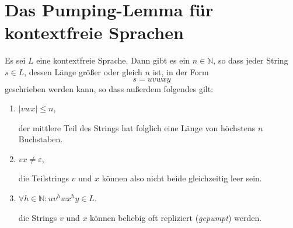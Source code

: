 \section{Das Pumping-Lemma f\"ur kontextfreie Sprachen}
\begin{Satz}
Es sei $L$ eine kontextfreie Sprache.  Dann gibt es ein $n \in \mathbb{N}$, so dass jeder String
$s \in L$, dessen L\"ange gr\"o{\ss}er oder gleich $n$ ist, in der Form 
\[ s = uvwxy \]
geschrieben werden kann, so dass au{\ss}erdem folgendes gilt:
\begin{enumerate}
\item $|vwx| \leq n$,

      der mittlere Teil des Strings hat folglich eine L\"ange von h\"ochstens $n$ Buchstaben.
\item $vx \not= \varepsilon$,

      die Teilstrings $v$ und $x$ k\"onnen also nicht beide gleichzeitig leer sein.
\item $\forall h \in \mathbb{N}: uv^hwx^hy \in L$.

      die Strings $v$ und $x$ k\"onnen beliebig oft repliziert (\emph{gepumpt}) werden. 
\end{enumerate}
\end{Satz}

